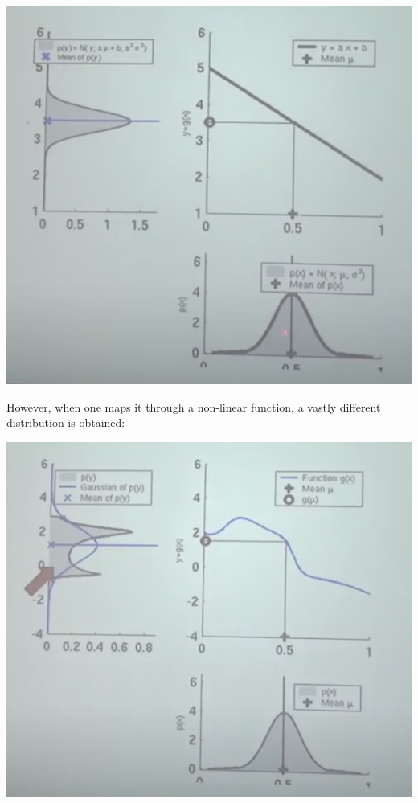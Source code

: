 \documentclass[a4paper]{article}
\begin{document}
\begin{center}
    \includegraphics[scale=0.5]{linasm}
\end{center}

However, when one maps it through a non-linear function, a vastly different distribution is obtained:

\begin{center}
    \includegraphics[scale=0.5]{nldist}
\end{center}
\end{document}
